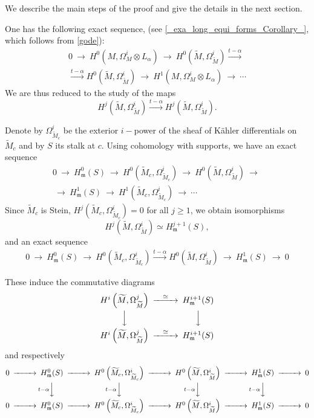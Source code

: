 \documentclass[11pt]{article}
\numberwithin{equation}{section}
\newcommand{\arrow}{{\:\longrightarrow\:}}
\newcommand{\6}{\partial}
\renewcommand{\tilde}{\widetilde}
\renewcommand{\geq}{\geqslant}
\def\m{\mathfrak m}
\begin{document}
We  describe the main steps of the proof and give the details in the next section.

\hfill

 One has the following exact sequence,  (see \ref{_exa_long_equi_forms_Corollary_}, which follows from \ref{gode}):
\begin{multline}\label{exa1}
0\arrow H^0(M,\Omega^i_M \otimes L_\alpha) 
\arrow H^0(\tilde M,\Omega^i_{\tilde M})\stackrel{t-\alpha}
\arrow \\
\stackrel{t-\alpha}
\arrow H^0(\tilde M,\Omega^i_{\tilde M})\arrow\allowbreak
H^1(M,\Omega^i_M \otimes L_\alpha)
\arrow \cdots
\end{multline}
We are thus reduced to the study of the maps 
$$H^j\left(\tilde M,\Omega^i_{\tilde M}\right)\stackrel{t-\alpha}
\arrow 
H^j\left(\tilde M, \Omega^i_{\tilde M}\right).$$

Denote by  $\Omega^i_{\tilde M_c}$ be the exterior $i-$power of the sheaf of K\"ahler differentials on $\tilde M_c$ and {by} $S$ its stalk at $c.$ Using cohomology with supports, we have an exact sequence
\begin{multline*}
0\arrow H^0_{\m}(S) 
\arrow H^0\left(\tilde M_c, \Omega^i_{\tilde M_c}\right)\arrow
H^0\left(\tilde M, \Omega^i_{\tilde M}\right)\arrow\\
\arrow
H^1_{\m}(S)
\arrow H^1\left(\tilde M_c, \Omega^i_{\tilde M_c}\right)\arrow\cdots
\end{multline*}
Since $\tilde M_c$ is Stein, $H^j\left(\tilde M_c, \Omega^i_{\tilde M_c}\right)=0$ for all $j\geq 1$,   we obtain isomorphisms 
$$H^j\left(\tilde M, \Omega^i_{\tilde M}\right)\simeq H^{j+1}_\m(S),$$  
and an exact sequence
\begin{multline*}
0\arrow H^0_{\m}(S) 
\arrow H^0\left(\tilde M_c, \Omega^i_{\tilde M_c}\right)\stackrel{t-\alpha}\arrow
H^0\left(\tilde M, \Omega^i_{\tilde M}\right)\arrow
H^1_{\m}(S)
\arrow 0
\end{multline*}

These induce the commutative diagrams
\begin{equation}\label{diag1}
\begin{CD}
H^i\left(\tilde M, \Omega^j_{\tilde M}\right)@>{\simeq}>> H^{i+1}_\m(S)\\
@VVV @VVV\\
H^i\left(\tilde M, \Omega^j_{\tilde M}\right)@>{\simeq}>> H^{i+1}_\m(S)
\end{CD}
\end{equation}
and respectively
{\scriptsize \begin{equation}\label{diag2}
\begin{CD}
0@>>>H^0_{\m}(S)@>>>H^0\left(\tilde M_c, \Omega^i_{\tilde M_c}\right)@>>> H^0\left(\tilde M, \Omega^i_{\tilde M}\right)@>>>H^1_{\m}(S)@>>>0\\
@. @V{t-\alpha}VV @V{t-\alpha}VV @V{t-\alpha}VV @V{t-\alpha}VV @.\\
0@>>>H^0_{\m}(S)@>>>H^0\left(\tilde M_c, \Omega^i_{\tilde M_c}\right)@>>> H^0\left(\tilde M, \Omega^i_{\tilde M}\right)@>>>H^1_{\m}(S)@>>>0
\end{CD}
\end{equation}}
\end{document}
